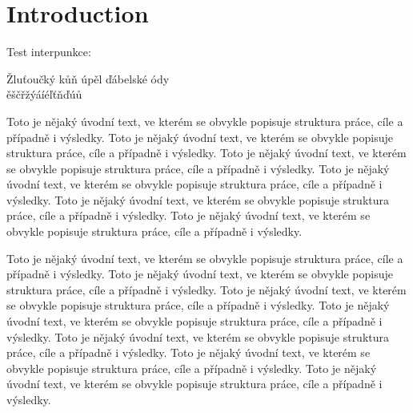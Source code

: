 \chapter*{Introduction}

Test interpunkce:
\begin{center}
  Žluťoučký kůň úpěl ďábelské ódy\\
  ěščřžýáíéľťňďúů
\end{center}

Toto je nějaký úvodní text, ve kterém se obvykle popisuje struktura práce, cíle a případně i výsledky. Toto je nějaký
úvodní text, ve kterém se obvykle popisuje struktura práce, cíle a případně i výsledky. Toto je nějaký
úvodní text, ve kterém se obvykle popisuje struktura práce, cíle a případně i výsledky. Toto je nějaký
úvodní text, ve kterém se obvykle popisuje struktura práce, cíle a případně i výsledky. Toto je nějaký
úvodní text, ve kterém se obvykle popisuje struktura práce, cíle a případně i výsledky. Toto je nějaký
úvodní text, ve kterém se obvykle popisuje struktura práce, cíle a případně i výsledky. 

Toto je nějaký
úvodní text, ve kterém se obvykle popisuje struktura práce, cíle a případně i výsledky. Toto je nějaký
úvodní text, ve kterém se obvykle popisuje struktura práce, cíle a případně i výsledky. Toto je nějaký
úvodní text, ve kterém se obvykle popisuje struktura práce, cíle a případně i výsledky. Toto je nějaký
úvodní text, ve kterém se obvykle popisuje struktura práce, cíle a případně i výsledky. Toto je nějaký
úvodní text, ve kterém se obvykle popisuje struktura práce, cíle a případně i výsledky. Toto je nějaký
úvodní text, ve kterém se obvykle popisuje struktura práce, cíle a případně i výsledky. Toto je nějaký
úvodní text, ve kterém se obvykle popisuje struktura práce, cíle a případně i výsledky. 





